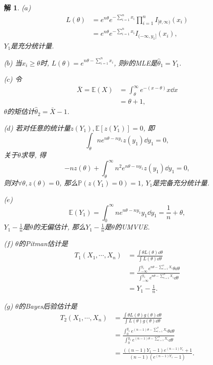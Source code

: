 \documentclass[a4paper,oneside,12pt]{ctexart}
\theoremstyle{plain}
\theoremstyle{nonumberplain}
\newtheorem{solution}{解}
\theoremstyle{nonumberplain}
\newcommand{\expect}{\mathbb{E}}
\newcommand{\prob}{\mathbb{P}}
\begin{document}
    \begin{solution}
        ($a$) \begin{align*}
            L(\theta)&=e^{n\theta}e^{-\sum_{i=1}^nx_i}\prod_{i=1}^nI_{[\theta,\infty)}(x_i)\\
            &=e^{n\theta}e^{-\sum_{i=1}^nx_i}I_{(-\infty,y_1]}(x_i),
        \end{align*}
        $Y_1$是充分统计量. 

        ($b$) 当$x_i\geqslant \theta$时, $L(\theta)=e^{n\theta-\sum_{i=1}^nx_i}$, 则$\theta$的MLE是$\hat{\theta}_1=Y_1$.

        ($c$) 令\begin{align*}
            \bar{X}=\expect(X)&=\int_\theta^\infty e^{-(x-\theta)}x\dd{x}\\
            &=\theta+1,
        \end{align*}
        $\theta$的矩估计$\hat{\theta}_2=\bar{X}-1$.

        ($d$) 若对任意的统计量$z(Y_1),\expect[z(Y_1)]=0$, 即 
        \begin{equation*}
            \int_\theta ne^{n\theta-ny_1}z(y_1)\dd{y_1}=0,
        \end{equation*}
        关于$\theta$求导, 得
        \begin{equation*}
            -nz(\theta)+\int_\theta^\infty n^2e^{n\theta-ny_1}z(y_1)\dd{y_1}=0,
        \end{equation*}
        则对$\forall \theta, z(\theta)=0$, 那么$\prob(z(Y_1)=0)=1$, $Y_1$是完备充分统计量.

        ($e$) \begin{equation*}
            \expect(Y_1)=\int_0^\infty ne^{n\theta-ny_1}y_1\dd{y_1}=\frac{1}{n}+\theta,
        \end{equation*}
        $Y_1-\frac{1}{n}$是$\theta$的无偏估计, 那么$Y_1-\frac{1}{n}$是$\theta$的UMVUE.

        ($f$) $\theta$的Pitman估计是 
        \begin{align*}
            T_1(X_1,\cdots,X_n)&=\frac{\int \theta L(\theta)\dd{\theta}}{\int L(\theta)\dd{\theta}}\\
            &=\frac{\int_{-\infty}^{y_1}e^{n\theta-\sum_{i=1}^nX_i}\theta\dd{\theta}}{\int_{-\infty}^{y_1}e^{n\theta-\sum_{i=1}^nX_i}\dd{\theta}}\\
            &=Y_1-\frac{1}{n}.
        \end{align*}

        ($g$) $\theta$的Bayes后验估计是 
        \begin{align*}
            T_2(X_1,\cdots,X_n)&=\frac{\int\theta L(\theta)g(\theta)\dd{\theta}}{\int L(\theta)g(\theta)\dd{\theta}}\\
            &=\frac{\int_0^{y_1}e^{(n-1)\theta-\sum_{i=1}^nX_i}\theta\dd{\theta}}{\int_0^{y_1}e^{(n-1)\theta-\sum_{i=1}^nX_i}\dd{\theta}}\\
            &=\frac{((n-1)Y_1-1)e^{(n-1)Y_1}+1}{(n-1)(e^{(n-1)Y_1}-1)}.
        \end{align*}
    \end{solution}
\end{document}
